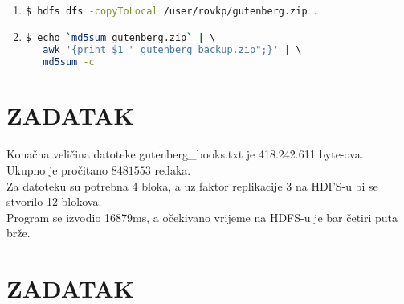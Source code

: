 \documentclass[paper=a4, fontsize=11pt]{scrartcl}
\numberwithin{equation}{section}		%
\numberwithin{figure}{section}			%
\numberwithin{table}{section}				%
\begin{document}
\begin{enumerate}
\item{
\begin{lstlisting}[language=bash]
  $ hdfs dfs -copyToLocal /user/rovkp/gutenberg.zip .
\end{lstlisting}
}

\item{
\begin{lstlisting}[language=bash]
  $ echo `md5sum gutenberg.zip` | \ 
   awk '{print $1 " gutenberg_backup.zip";}' | \ 
   md5sum -c
\end{lstlisting}
}


\end{enumerate}

\section{ZADATAK}



\paragraph{}
Konačna veličina datoteke gutenberg\_books.txt je 418.242.611 byte-ova.\\

Ukupno je pročitano $8481553$ redaka.\\

Za datoteku su potrebna 4 bloka, a uz faktor replikacije 3 na HDFS-u bi se stvorilo 12 blokova. \\

Program se izvodio 16879ms, a očekivano vrijeme na HDFS-u je bar četiri puta brže.

\pagebreak
\section{ZADATAK}


\end{document}
